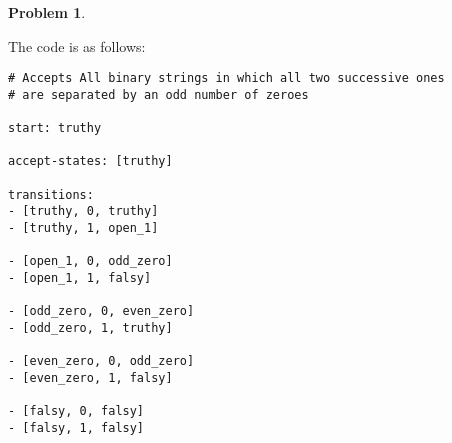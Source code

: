\documentclass[11pt]{article}
\theoremstyle{definition}
\theoremstyle{case}
\theoremstyle{theorem}
\newtheorem{prob}{Problem}
\begin{document}
\newpage

\begin{prob}\end{prob}

The code is as follows:
\begin{tcolorbox}
\begin{verbatim}
# Accepts All binary strings in which all two successive ones
# are separated by an odd number of zeroes

start: truthy

accept-states: [truthy]

transitions:
- [truthy, 0, truthy]
- [truthy, 1, open_1]

- [open_1, 0, odd_zero]
- [open_1, 1, falsy]

- [odd_zero, 0, even_zero]
- [odd_zero, 1, truthy]

- [even_zero, 0, odd_zero]
- [even_zero, 1, falsy]

- [falsy, 0, falsy]
- [falsy, 1, falsy]
\end{verbatim}
\end{tcolorbox}
\end{document}
